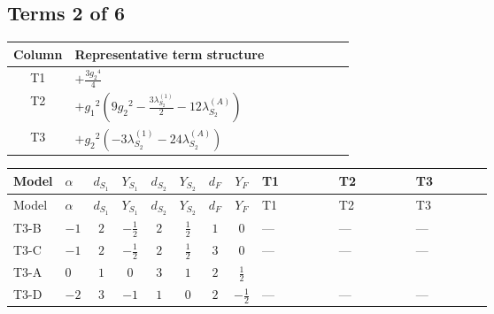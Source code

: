 \documentclass[8pt]{article}
\begin{document}
\begin{landscape}
\subsection*{Terms 2 of 6}
\begin{center}
\begin{tabular}{@{}c >{\raggedright\arraybackslash}p{0.82\linewidth}@{}}
\toprule
Column & Representative term structure \\
\midrule
T1 & \(\displaystyle +\frac{3 {g_2}^4}{4}\) \\
\midrule
T2 & \(\displaystyle +{g_1}^2 \left(9 {g_2}^2-\frac{3 {\lambda_{S_2}^{(1)}}}{2}-12 {\lambda_{S_2}^{(A)}}\right)\) \\
\midrule
T3 & \(\displaystyle +{g_2}^2 (-3 {\lambda_{S_2}^{(1)}}-24 {\lambda_{S_2}^{(A)}})\) \\
\midrule
\bottomrule
\end{tabular}
\end{center}
\smallskip
\tiny
\begin{longtable}{@{}llcccccc >{\raggedright\arraybackslash}p{0.21\linewidth} >{\raggedright\arraybackslash}p{0.21\linewidth} >{\raggedright\arraybackslash}p{0.21\linewidth}@{}}
\toprule
Model & $\alpha$ & $d_{S_1}$ & $Y_{S_1}$ & $d_{S_2}$ & $Y_{S_2}$ & $d_F$ & $Y_F$ & T1 & T2 & T3 \\
\midrule
\endfirsthead
\toprule
Model & $\alpha$ & $d_{S_1}$ & $Y_{S_1}$ & $d_{S_2}$ & $Y_{S_2}$ & $d_F$ & $Y_F$ & T1 & T2 & T3 \\
\midrule
\endhead
T3-B & $-1$ & $2$ & $-\frac{1}{2}$ & $2$ & $\frac{1}{2}$ & $1$ & $0$ & --- & --- & --- \\
\midrule
T3-C & $-1$ & $2$ & $-\frac{1}{2}$ & $2$ & $\frac{1}{2}$ & $3$ & $0$ & --- & --- & --- \\
\midrule
T3-A & $0$ & $1$ & $0$ & $3$ & $1$ & $2$ & $\frac{1}{2}$ & \scriptsize\adjustbox{max width=\linewidth}{$\begin{gathered} +\frac{3 {g_2}^4}{4}\end{gathered}$} & \scriptsize\adjustbox{max width=\linewidth}{$\begin{gathered} +{g_1}^2 \left(9 {g_2}^2-\frac{3 {\lambda_{S_2}^{(1)}}}{2}-12 {\lambda_{S_2}^{(A)}}\right)\end{gathered}$} & \scriptsize\adjustbox{max width=\linewidth}{$\begin{gathered} +{g_2}^2 (-3 {\lambda_{S_2}^{(1)}}-24 {\lambda_{S_2}^{(A)}})\end{gathered}$} \\
\midrule
T3-D & $-2$ & $3$ & $-1$ & $1$ & $0$ & $2$ & $-\frac{1}{2}$ & --- & --- & --- \\

\end{longtable}
\end{landscape}
\end{document}
